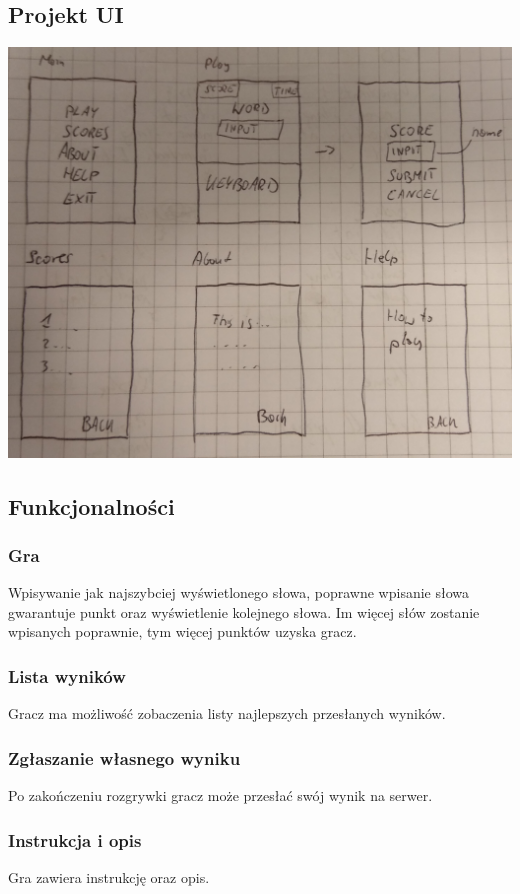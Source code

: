 \documentclass[12pt,a4paper]{article}
\begin{document}
		\subsection{Projekt UI}
			\includegraphics[width=\textwidth]{uiProject.jpg}
			
\clearpage	\subsection{Funkcjonalności}
			\subsubsection{Gra}
			Wpisywanie jak najszybciej wyświetlonego słowa, poprawne wpisanie słowa gwarantuje punkt oraz wyświetlenie kolejnego słowa. Im więcej słów zostanie wpisanych poprawnie, tym więcej punktów uzyska gracz.
			\subsubsection{Lista wyników}
			Gracz ma możliwość zobaczenia listy najlepszych przesłanych wyników.
			\subsubsection{Zgłaszanie własnego wyniku}
			Po zakończeniu rozgrywki gracz może przesłać swój wynik na serwer.
			\subsubsection{Instrukcja i opis}
			Gra zawiera instrukcję oraz opis.
\end{document}
